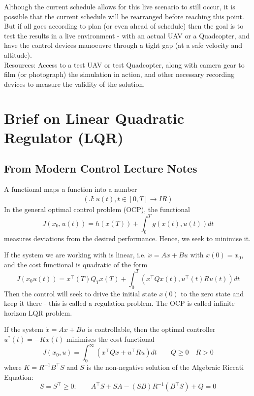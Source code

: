 \documentclass[11pt,draftd]{article}
\def\Real{I\!R}
\begin{document}
\begin{appendices}
	Although the current schedule allows for this live scenario to still occur, it is possible that the current schedule will be rearranged before reaching this point. But if all goes according to plan (or even ahead of schedule) then the goal is to test the results in a live environment - with an actual UAV or a Quadcopter, and have the control devices manoeuvre through a tight gap (at a safe velocity and altitude). \\
	Resources: Access to a test UAV or test Quadcopter, along with camera gear to film (or photograph) the simulation in action, and other necessary recording devices to measure the validity of the solution. 
	\newpage
	
	\section{Brief on Linear Quadratic Regulator (LQR)}\label{app_itemC}
	\subsection{From Modern Control Lecture Notes}
	A functional maps a function into a number
	\begin{align}
	(J:u(t),t\in[0,T]\rightarrow \Real)
	\end{align}
	In the general optimal control problem (OCP), the functional 
	\[ J(x_{0},u(t)) = h(x(T)) + \int_{0}^{T}g(x(t),u(t))dt\]
	measures deviations from the desired performance. Hence, we seek to minimise it.
	
	If the system we are working with is linear, i.e. $ \dot{x} = Ax + Bu$ with $ x(0) = x_{0} $, and the cost functional is quadratic of the form
	\begin{equation}
	J(x_{0}u(t)) = x^{\intercal}(T)Q_{T}x(T) + \int_{0}^{T}(x^{\intercal}Qx(t), u^{\intercal}(t)Ru(t))dt
	\end{equation}
	Then the control will seek to drive the initial state $ x(0) $ to the zero state and keep it there - this is called a regulation problem. The OCP is called infinite horizon LQR problem.
	
	If the system $ \dot{x} = Ax + Bu$ is controllable, then the optimal controller $ u^{*}(t) = -Kx(t) $ minimises the cost functional
	\begin{equation}
	J(x_{0},u) = \int_{0}^{\infty} (x^{\intercal}Qx + u^{\intercal}Ru)dt \qquad Q\ge 0 \quad R > 0
	\end{equation}
	where $ K = R^{-1}B^{\intercal}S $ and $ S $ is the non-negative solution of the Algebraic Riccati Equation:
	\begin{equation}
	S = S^{\intercal}\ge 0: \qquad A^{\intercal}S + SA - (SB)R^{-1}(B^{\intercal}S) + Q = 0
	\end{equation}
	

\end{appendices}
\end{document}
